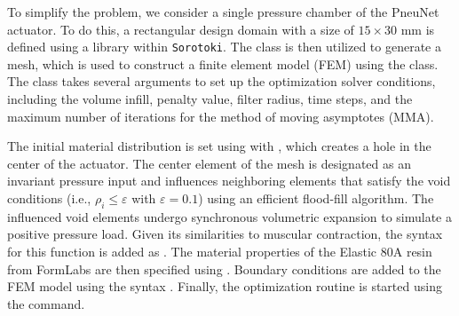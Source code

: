 To simplify the problem, we consider a single pressure chamber of the PneuNet actuator. To do this, a rectangular design domain with a size of $15 \times 30$ \si{\milli \meter} is defined using a  library within \texttt{Sorotoki}. The  class is then utilized to generate a mesh, which is used to construct a finite element model (FEM) using the  class. The  class takes several arguments to set up the optimization solver conditions, including the volume infill, penalty value, filter radius, time steps, and the maximum number of iterations for the method of moving asymptotes (MMA).

%
%
The initial material distribution is set using  with , which creates a hole in the center of the actuator. The center element of the mesh is designated as an invariant pressure input and influences neighboring elements that satisfy the void conditions (i.e., $\rho_i \le \varepsilon$ with $\varepsilon = 0.1$) using an efficient flood-fill algorithm. The influenced void elements undergo synchronous volumetric expansion to simulate a positive pressure load. Given its similarities to muscular contraction, the syntax for this function is added as . The material properties of the Elastic 80A resin from FormLabs are then specified using  \cite{Xavier2022Jun}. Boundary conditions are added to the FEM model using the syntax . Finally, the optimization routine is started using the  command. %





